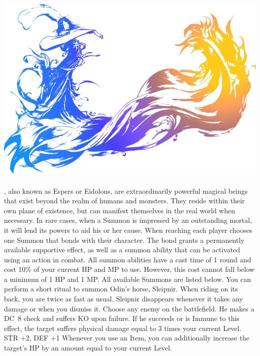%
\\\\
%
\includegraphics[width=\columnwidth]{./art/images/ff10.jpg}\\\\
%
, also known as Espers or Eidolons, are extraordinarily powerful magical beings that exist beyond the realm of humans and monsters.
They reside within their own plane of existence, but can manifest themselves in the real world when necessary.
In rare cases, when a Summon is impressed by an outstanding mortal, it will lend its powers to aid his or her cause.
When reaching  each player chooses one Summon that bonds with their character.
The bond grants a permanently available supportive effect, as well as a summon ability that can be activated using an action in combat. 
All summon abilities have a cast time of 1 round and cost 10\% of your current HP and MP to use.
However, this cost cannot fall below a minimum of 1 HP and 1 MP.
All available Summons are listed below.
%
\vfill
%
{You can perform a short ritual to summon Odin's horse, Sleipnir. When riding on its back, you are twice as fast as usual. Sleipnir disappears whenever it takes any damage or when you dismiss it.}
{Choose any enemy on the battlefield. He makes a DC~8 check and suffers KO upon failure. If he succeeds or is Immune to this effect, the target suffers physical damage equal to 3 times your current Level.}
{STR +2, DEF +1}
%
\newpage
%
{Whenever you use an Item, you can additionally increase the target's HP by an amount equal to your current Level.}
